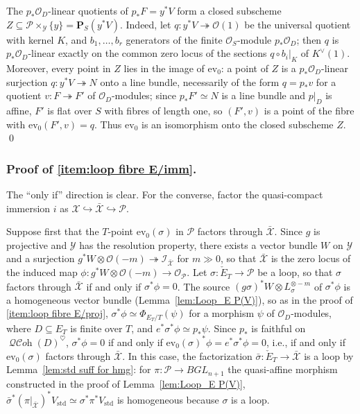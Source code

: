 \documentclass[12pt, oneside]{amsart}
\numberwithin{equation}{section}
\theoremstyle{remark}
\theoremstyle{plain}
\DeclareMathOperator{\QCOH}{\mathcal{QC}\textit{oh}}
\newcommand{\OO}{\mathcal{O}}
\newcommand{\YY}{\mathcal{Y}}
\newcommand{\XX}{\mathcal{X}}
\newcommand{\ev}{\mathrm{ev}}
\begin{document}
The $p_*\OO_D$-linear quotients of $p_*F = y^*V$ form a closed subscheme $Z \subseteq \mathcal{P} \times_{\YY} \{y\} = \mathbf{P}_S(y^*V)$.
Indeed, let $q : y^*V \twoheadrightarrow \OO(1)$ be the universal quotient with kernel $K$, and $b_1, \ldots, b_r$ generators of the finite $\OO_S$-module $p_*\OO_D$; then $q$ is $p_*\OO_D$-linear exactly on the common zero locus of the sections $q \circ b_i|_K$ of $K^\vee(1)$.
Moreover, every point in $Z$ lies in the image of $\ev_0$: a point of $Z$ is a $p_*\OO_D$-linear surjection $q : y^*V \twoheadrightarrow N$ onto a line bundle, necessarily of the form $q = p_*v$ for a quotient $v : F \twoheadrightarrow F'$ of $\OO_{D}$-modules; since $p_*F' \simeq N$ is a line bundle and $p|_D$ is affine, $F'$ is flat over $S$ with fibres of length one, so $(F',v)$ is a point of the fibre with $\ev_0(F',v) = q$.
Thus $\ev_0$ is an isomorphism onto the closed subscheme $Z$.
\qed

\subsubsection*{Proof of \ref{item:loop fibre E/imm}.}
The ``only if'' direction is clear.
For the converse, factor the quasi-compact immersion $i$ as $\XX \hookrightarrow \bar{\XX} \hookrightarrow \mathcal{P}$.

Suppose first that the $T$-point $\ev_0(\sigma)$ in $\mathcal{P}$ factors through $\bar{\XX}$.
Since $g$ is projective and $\YY$ has the resolution property, there exists a vector bundle $W$ on $\YY$ and a surjection $g^*W \otimes \OO(-m) \twoheadrightarrow \mathcal{I}_{\bar{\XX}}$ for $m \gg 0$, so that $\bar{\XX}$ is the zero locus of the induced map $\phi : g^*W \otimes \OO(-m) \to \OO_{\mathcal{P}}$.
Let $\sigma : \check{E}_T \to \mathcal{P}$ be a loop, so that $\sigma$ factors through $\bar{\XX}$ if and only if $\sigma^*\phi = 0$.
The source $(g\sigma)^*W \otimes L_\sigma^{\otimes -m}$ of $\sigma^*\phi$ is a homogeneous vector bundle (Lemma~\ref{lem:Loop_E P(V)}), so as in the proof of \ref{item:loop fibre E/proj}, $\sigma^*\phi \simeq \Phi_{E_T/T}(\psi)$ for a morphism $\psi$ of $\OO_D$-modules, where $D \subseteq E_T$ is finite over $T$, and $e^*\sigma^*\phi \simeq p_*\psi$.
Since $p_*$ is faithful on $\QCOH(D)^\heartsuit$, $\sigma^*\phi = 0$ if and only if $\ev_0(\sigma)^*\phi = e^*\sigma^*\phi = 0$, i.e., if and only if $\ev_0(\sigma)$ factors through $\bar{\XX}$.
In this case, the factorization $\bar\sigma : \check{E}_T \to \bar{\XX}$ is a loop by Lemma~\ref{lem:std suff for hmg}: for $\pi : \mathcal{P} \to BGL_{n+1}$ the quasi-affine morphism constructed in the proof of Lemma~\ref{lem:Loop_E P(V)}, $\bar\sigma^*(\pi|_{\bar{\XX}})^*V_{\mathrm{std}} \simeq \sigma^*\pi^*V_{\mathrm{std}}$ is homogeneous because $\sigma$ is a loop.
\end{document}
